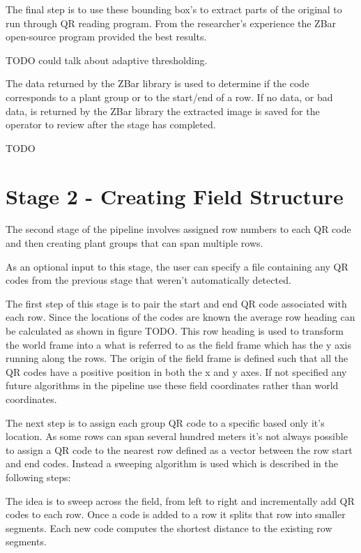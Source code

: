 The final step is to use these bounding box's to extract parts of the original to run through QR reading program.  From the researcher's experience the ZBar open-source program provided the best results.  

TODO could talk about adaptive thresholding.  

The data returned by the ZBar library is used to determine if the code corresponds to a plant group or to the start/end of a row.  If no data, or bad data, is returned by the ZBar library the extracted image is saved for the operator to review after the stage has completed. 

TODO


\section{Stage 2 - Creating Field Structure}
\label{processing-stage2}

The second stage of the pipeline involves assigned row numbers to each QR code and then creating plant groups that can span multiple rows.  

As an optional input to this stage, the user can specify a file containing any QR codes from the previous stage that weren't automatically detected.  

The first step of this stage is to pair the start and end QR code associated with each row.  Since the locations of the codes are known the average row heading can be calculated as shown in figure TODO.  This row heading is used to transform the world frame into a what is referred to as the field frame which has the y axis running along the rows.  The origin of the field frame is defined such that all the QR codes have a positive position in both the x and y axes.  If not specified any future algorithms in the pipeline use these field coordinates rather than world coordinates.  

The next step is to assign each group QR code to a specific based only it's location.  As some rows can span several hundred meters it's not always possible to assign a QR code to the nearest row defined as a vector between the row start and end codes.  Instead a sweeping algorithm is used which is described in the following steps:

The idea is to sweep across the field, from left to right and incrementally add QR codes to each row. Once a code is added to a row it splits that row into smaller segments.  Each new code computes the shortest distance to the existing row segments.

